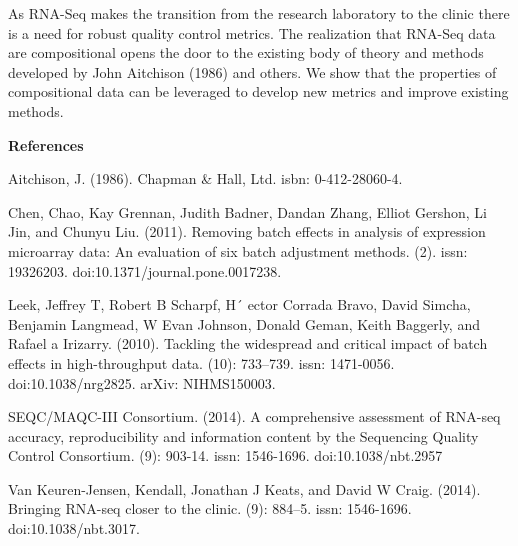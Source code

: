 \documentclass [10pt]{article}\usepackage[]{graphicx}\usepackage[]{color}
\begin{document}
As RNA-Seq makes the transition from the research laboratory to the clinic there is a need for robust quality control metrics.  The realization that RNA-Seq data are compositional opens the door to the existing body of theory and methods developed by John Aitchison (1986) and others.  We show that the properties of compositional data can be leveraged to develop new metrics and improve existing methods.

\vskip 0.2cm {\bf References}

\vspace{0.5mm}
\hangindent=0.5cm  %
Aitchison, J. (1986). 
 Chapman \& Hall, Ltd. isbn: 0-412-28060-4.

\vspace{0.5mm}
\hangindent=0.5cm  %
Chen, Chao, Kay Grennan, Judith Badner, Dandan Zhang, Elliot Gershon, Li Jin, and Chunyu
Liu. (2011). 
\newblock Removing batch effects in analysis of expression microarray data: An evaluation
of six batch adjustment methods. 
 (2). issn: 19326203. doi:10.1371/journal.pone.0017238.

\vspace{0.5mm}
\hangindent=0.5cm  %
Leek, Jeffrey T, Robert B Scharpf, H´ ector Corrada Bravo, David Simcha, Benjamin Langmead,
W Evan Johnson, Donald Geman, Keith Baggerly, and Rafael a Irizarry. (2010). 
\newblock Tackling the widespread and critical impact of batch effects in high-throughput data.
 (10): 733–739. issn: 1471-0056. doi:10.1038/nrg2825. arXiv: NIHMS150003. 

\vspace{0.5mm}
\hangindent=0.5cm  %
SEQC/MAQC-III Consortium. (2014). 
\newblock A comprehensive assessment of RNA-seq accuracy, reproducibility and information content by the Sequencing Quality Control Consortium.
 (9): 903-14. issn: 1546-1696. doi:10.1038/nbt.2957 

\vspace{0.5mm}
\hangindent=0.5cm  %
Van Keuren-Jensen, Kendall, Jonathan J Keats, and David W Craig. (2014). 
\newblock Bringing RNA-seq closer to the clinic. 
 (9): 884–5. issn: 1546-1696. doi:10.1038/nbt.3017. 
\end{document}
